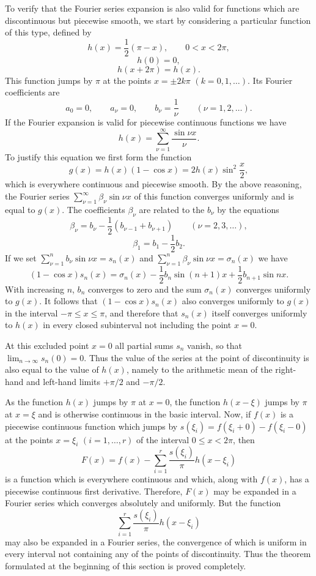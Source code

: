 To verify that the Fourier series expansion is also valid for functions which are discontinuous but piecewise smooth, we start by considering a particular function of this type, defined by
\[
h(x)=\frac12(\pi-x),\qquad 0<x<2\pi,
\]
\[
h(0)=0,
\]
\[
h(x+2\pi)=h(x).
\]
This function jumps by $\pi$ at the points $x=\pm2k\pi$ $(k=0,1,\ldots)$. Its Fourier coefficients are
\[
a_0=0,\qquad a_\nu=0,\qquad b_\nu=\frac1\nu\qquad(\nu=1,2,\ldots).
\]
If the Fourier expansion is valid for piecewise continuous functions we have
\[
h(x)=\sum_{\nu=1}^{\infty}\frac{\sin\nu x}{\nu}.
\]
To justify this equation we first form the function
\[
g(x)=h(x)(1-\cos x)=2h(x)\sin^2\frac{x}{2},
\]
which is everywhere continuous and piecewise smooth. By the above reasoning, the Fourier series $\sum_{\nu=1}^{\infty}\beta_\nu\sin\nu x$ of this function converges uniformly and is equal to $g(x)$. The coefficients $\beta_\nu$ are related to the $b_\nu$ by the equations
\[
\beta_\nu=b_\nu-\frac12(b_{\nu-1}+b_{\nu+1})\qquad(\nu=2,3,\ldots),
\]
\[
\beta_1=b_1-\frac12b_2.
\]
If we set $\sum_{\nu=1}^{n}b_\nu\sin\nu x=s_n(x)$ and $\sum_{\nu=1}^{n}\beta_\nu\sin\nu x=\sigma_n(x)$ we have
\[
(1-\cos x)s_n(x)=\sigma_n(x)-\frac12b_n\sin(n+1)x+\frac12b_{n+1}\sin nx.
\]
With increasing $n$, $b_n$ converges to zero and the sum $\sigma_n(x)$ converges uniformly to $g(x)$. It follows that $(1-\cos x)s_n(x)$ also converges uniformly to $g(x)$ in the interval $-\pi\le x\le\pi$, and therefore that $s_n(x)$ itself converges uniformly to $h(x)$ in every closed subinterval not including the point $x=0$.

At this excluded point $x=0$ all partial sums $s_n$ vanish, so that $\lim_{n\to\infty}s_n(0)=0$. Thus the value of the series at the point of discontinuity is also equal to the value of $h(x)$, namely to the arithmetic mean of the right-hand and left-hand limits $+\pi/2$ and $-\pi/2$.

As the function $h(x)$ jumps by $\pi$ at $x=0$, the function $h(x-\xi)$ jumps by $\pi$ at $x=\xi$ and is otherwise continuous in the basic interval. Now, if $f(x)$ is a piecewise continuous function which jumps by $s(\xi_i)=f(\xi_i+0)-f(\xi_i-0)$ at the points $x=\xi_i$ $(i=1,\ldots,r)$ of the interval $0\le x<2\pi$, then
\[
F(x)=f(x)-\sum_{i=1}^{r}\frac{s(\xi_i)}{\pi}h(x-\xi_i)
\]
is a function which is everywhere continuous and which, along with $f(x)$, has a piecewise continuous first derivative. Therefore, $F(x)$ may be expanded in a Fourier series which converges absolutely and uniformly. But the function
\[
\sum_{i=1}^{r}\frac{s(\xi_i)}{\pi}h(x-\xi_i)
\]
may also be expanded in a Fourier series, the convergence of which is uniform in every interval not containing any of the points of discontinuity. Thus the theorem formulated at the beginning of this section is proved completely.

